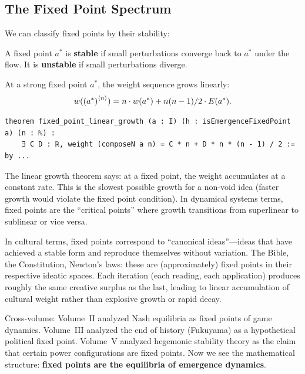 \subsection{The Fixed Point Spectrum}

We can classify fixed points by their stability:

\begin{definition}
\label{def:stable-fixed}
A fixed point $a^*$ is \textbf{stable} if small perturbations converge back
to $a^*$ under the flow. It is \textbf{unstable} if small perturbations diverge.
\end{definition}

\begin{theorem}
\label{thm:linear-growth-fixed}
At a strong fixed point $a^*$, the weight sequence grows linearly:
\[
  w({(a^*)}^{\langle n \rangle}) = n \cdot w(a^*) + n(n-1)/2 \cdot E(a^*).
\]
\end{theorem}

\begin{lstlisting}[caption={Fixed point linear growth (IDT\_v3\_Emergence.lean)}]
theorem fixed_point_linear_growth (a : I) (h : isEmergenceFixedPoint a) (n : ℕ) :
    ∃ C D : ℝ, weight (composeN a n) = C * n + D * n * (n - 1) / 2 := by ...
\end{lstlisting}

\begin{interpretation}
The linear growth theorem says: at a fixed point, the weight accumulates at a
constant rate. This is the slowest possible growth for a non-void idea (faster
growth would violate the fixed point condition). In dynamical systems terms,
fixed points are the ``critical points'' where growth transitions from
superlinear to sublinear or vice versa.

In cultural terms, fixed points correspond to ``canonical ideas''---ideas that
have achieved a stable form and reproduce themselves without variation. The
Bible, the Constitution, Newton's laws: these are (approximately) fixed points
in their respective ideatic spaces. Each iteration (each reading, each
application) produces roughly the same creative surplus as the last, leading
to linear accumulation of cultural weight rather than explosive growth or
rapid decay.

Cross-volume: Volume~II analyzed Nash equilibria as fixed points of game
dynamics. Volume~III analyzed the end of history (Fukuyama) as a hypothetical
political fixed point. Volume~V analyzed hegemonic stability theory as the
claim that certain power configurations are fixed points. Now we see the
mathematical structure: \textbf{fixed points are the equilibria of emergence
dynamics}.
\end{interpretation}

